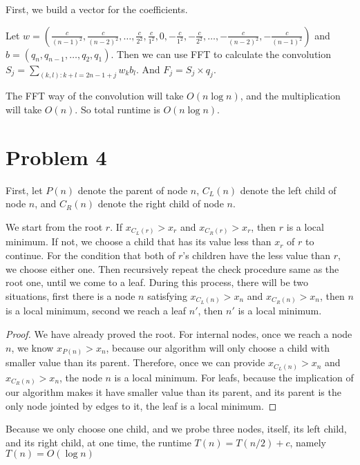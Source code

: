 \documentclass[letter,12pt]{article}
\begin{document}
First, we build a vector for the coefficients. 

Let $w=(\frac{c}{(n-1)^2}, 
\frac{c}{(n-2)^2}, \ldots, \frac{c}{2^2}, \frac{c}{1^2}, 0, -\frac{c}{1^2},
-\frac{c}{2^2}, \ldots, -\frac{c}{(n-2)^2}, -\frac{c}{(n-1)^2})$ and
$b=(q_n, q_{n-1}, \ldots, q_2, q_1)$. Then we can use FFT to calculate
the convolution $S_j=\sum\limits_{(k,l):k+l=2n-1+j} w_k b_l$. And 
$F_j=S_j \times q_j$.

The FFT way of the convolution will take $O(n\log n)$, and the 
multiplication will take $O(n)$. So total runtime is $O(n\log n)$.

\section*{Problem 4}
First, let $P(n)$ denote the parent of node $n$, $C_L(n)$ denote the
left child of node $n$, and $C_R(n)$ denote the right child of node $n$.

We start from the root $r$. If $x_{C_L(r)} > x_r$ and $x_{C_R(r)} > x_r$,
then $r$ is a local minimum. If not, we choose a child that has its value 
less than $x_r$ of $r$ to continue. For the condition that both of $r$'s 
children have the less value than $r$, we choose either one. Then 
recursively repeat the check procedure same as the root one, until we 
come to a leaf. During this process, there will be two situations, first there 
is a node $n$ satisfying $x_{C_L(n)} > x_n$ and $x_{C_R(n)} > x_n$, then 
$n$ is a local minimum, second we reach a leaf $n'$, then $n'$ is a local 
minimum. 

\begin{proof}
We have already proved the root. For internal nodes, once we reach a node
$n$, we know $x_{P(n)} > x_n$, because our algorithm will only choose a 
child with smaller value than its parent. Therefore, once we can provide
$x_{C_L(n)} > x_n$ and $x_{C_R(n)} > x_n$, the node $n$ is a local 
minimum. For leafs, because the implication of our algorithm makes it 
have smaller value than its parent, and its parent is the only node jointed
by edges to it, the leaf is a local minimum. 
\end{proof}

Because we only choose one child, and we probe three nodes, itself, its
left child, and its right child, at one time, the runtime $T(n)=T(n/2)+c$,
namely $T(n)=O(\log n)$
\end{document}
